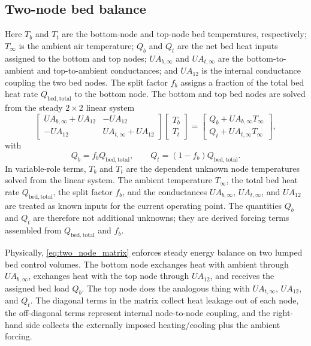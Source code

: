 \documentclass[11pt]{article}
\begin{document}
\subsection{Two-node bed balance}
Here \(T_b\) and \(T_t\) are the bottom-node and top-node bed temperatures, respectively; \(T_\infty\) is the ambient air temperature; \(Q_b\) and \(Q_t\) are the net bed heat inputs assigned to the bottom and top nodes; \(UA_{b,\infty}\) and \(UA_{t,\infty}\) are the bottom-to-ambient and top-to-ambient conductances; and \(UA_{12}\) is the internal conductance coupling the two bed nodes. The split factor \(f_b\) assigns a fraction of the total bed heat rate \(Q_{\mathrm{bed,total}}\) to the bottom node.
The bottom and top bed nodes are solved from the steady \(2\times 2\) linear system
\begin{equation}
\label{eq:two_node_matrix}
\begin{bmatrix}
UA_{b,\infty}+UA_{12} & -UA_{12} \\
-UA_{12} & UA_{t,\infty}+UA_{12}
\end{bmatrix}
\begin{bmatrix}
T_b\\
T_t
\end{bmatrix}
=
\begin{bmatrix}
Q_b+UA_{b,\infty}T_\infty\\
Q_t+UA_{t,\infty}T_\infty
\end{bmatrix},
\end{equation}
with
\begin{equation}
\label{eq:two_node_split}
Q_b=f_bQ_{\mathrm{bed,total}},
\qquad
Q_t=(1-f_b)Q_{\mathrm{bed,total}}.
\end{equation}
In variable-role terms, \(T_b\) and \(T_t\) are the dependent unknown node temperatures solved from the linear system. The ambient temperature \(T_\infty\), the total bed heat rate \(Q_{\mathrm{bed,total}}\), the split factor \(f_b\), and the conductances \(UA_{b,\infty}\), \(UA_{t,\infty}\), and \(UA_{12}\) are treated as known inputs for the current operating point. The quantities \(Q_b\) and \(Q_t\) are therefore not additional unknowns; they are derived forcing terms assembled from \(Q_{\mathrm{bed,total}}\) and \(f_b\).

Physically, \eqref{eq:two_node_matrix} enforces steady energy balance on two lumped bed control volumes. The bottom node exchanges heat with ambient through \(UA_{b,\infty}\), exchanges heat with the top node through \(UA_{12}\), and receives the assigned bed load \(Q_b\). The top node does the analogous thing with \(UA_{t,\infty}\), \(UA_{12}\), and \(Q_t\). The diagonal terms in the matrix collect heat leakage out of each node, the off-diagonal terms represent internal node-to-node coupling, and the right-hand side collects the externally imposed heating/cooling plus the ambient forcing.
\end{document}
